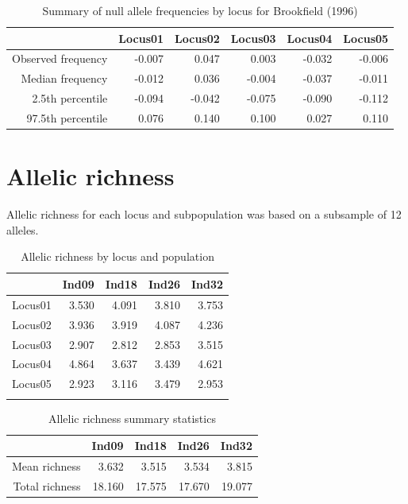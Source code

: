 \documentclass[a4paper]{scrartcl}\usepackage[]{graphicx}\usepackage[]{color}
\begin{document}
\begin{table}[ht]
\centering
\begin{tabular}{rrrrrr}
  \hline
 & Locus01 & Locus02 & Locus03 & Locus04 & Locus05 \\ 
  \hline
Observed frequency & -0.007 & 0.047 & 0.003 & -0.032 & -0.006 \\ 
  Median frequency & -0.012 & 0.036 & -0.004 & -0.037 & -0.011 \\ 
  2.5th percentile & -0.094 & -0.042 & -0.075 & -0.090 & -0.112 \\ 
  97.5th percentile & 0.076 & 0.140 & 0.100 & 0.027 & 0.110 \\ 
   \hline
\end{tabular}
\caption{Summary of null allele frequencies by locus for Brookfield (1996)} 
\end{table}


\FloatBarrier

\FloatBarrier


\section{Allelic richness}



Allelic richness for each locus and subpopulation was based on a subsample of {12} alleles.

\begin{table}[ht]
\centering
\begin{tabular}{rrrrr}
  \hline
 & Ind09 & Ind18 & Ind26 & Ind32 \\ 
  \hline
Locus01 & 3.530 & 4.091 & 3.810 & 3.753 \\ 
   \rowcolor[gray]{0.9} Locus02 & 3.936 & 3.919 & 4.087 & 4.236 \\ 
  Locus03 & 2.907 & 2.812 & 2.853 & 3.515 \\ 
   \rowcolor[gray]{0.9} Locus04 & 4.864 & 3.637 & 3.439 & 4.621 \\ 
  Locus05 & 2.923 & 3.116 & 3.479 & 2.953 \\ 
   \rowcolor[gray]{0.9}  \hline
\end{tabular}
\caption{Allelic richness by locus and population} 
\end{table}
\begin{table}[ht]
\centering
\begin{tabular}{rrrrr}
  \hline
 & Ind09 & Ind18 & Ind26 & Ind32 \\ 
  \hline
Mean richness & 3.632 & 3.515 & 3.534 & 3.815 \\ 
   \rowcolor[gray]{0.9} Total richness & 18.160 & 17.575 & 17.670 & 19.077 \\ 
   \hline
\end{tabular}
\caption{Allelic richness summary statistics} 
\end{table}
\end{document}

